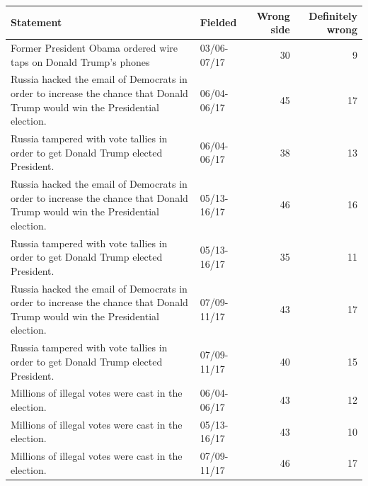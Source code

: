 \begin{tabular}{p{8.5cm}lrr}
\toprule
Statement & Fielded & Wrong side & Definitely wrong \\
\midrule
Former President Obama ordered wire taps on Donald Trump's phones & 03/06-07/17 & 30 &  9 \\
Russia hacked the email of Democrats in order to increase the chance that Donald Trump would win the Presidential election. & 06/04-06/17 & 45 & 17 \\
Russia tampered with vote tallies in order to get Donald Trump elected President. & 06/04-06/17 & 38 & 13 \\
Russia hacked the email of Democrats in order to increase the chance that Donald Trump would win the Presidential election. & 05/13-16/17 & 46 & 16 \\
Russia tampered with vote tallies in order to get Donald Trump elected President. & 05/13-16/17 & 35 & 11 \\
Russia hacked the email of Democrats in order to increase the chance that Donald Trump would win the Presidential election. & 07/09-11/17 & 43 & 17 \\
Russia tampered with vote tallies in order to get Donald Trump elected President. & 07/09-11/17 & 40 & 15 \\
Millions of illegal votes were cast in the election. & 06/04-06/17 & 43 & 12 \\
Millions of illegal votes were cast in the election. & 05/13-16/17 & 43 & 10 \\
Millions of illegal votes were cast in the election. & 07/09-11/17 & 46 & 17 \\
\bottomrule
\end{tabular}
